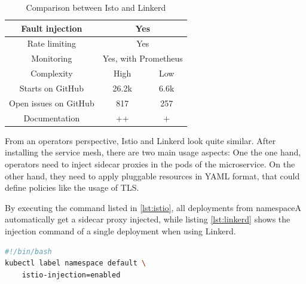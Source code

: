 \begin{table}
\begin{tabular*}{\columnwidth}{c|c|c}
Fault injection                  & \multicolumn{2}{c}{Yes}                                                                                                          \\\hline
Rate limiting                    & \multicolumn{2}{c}{Yes}                                                                                                          \\\hline
Monitoring                       & \multicolumn{2}{c}{Yes, with Prometheus}                                                                                         \\\hline
Complexity                       & High                                                                                                               & Low         \\\hline
Starts on GitHub \cite{linkerd-github} \cite{istio-github}              & 26.2k & 6.6k        \\\hline
Open issues on GitHub \cite{linkerd-github} \cite{istio-github}                 & 817                                                                                                                & 257         \\\hline
Documentation                    & ++                                                                                                                 & +          
\end{tabular*}
\vspace{0.25mm}
\caption{Comparison between Isto and Linkerd}
\label{tab:istio-linkerd}
\end{table}


%
%
%
%

From an operators perspective, Istio and Linkerd look quite similar. After installing the service mesh, there are two main usage aspects: One the one hand, operators need to inject sidecar proxies in the pods of the microservice. On the other hand, they need to apply pluggable resources in YAML format, that could define policies like the usage of TLS.

By executing the command listed in \ref{lst:istio}, all deployments from namespaceA automatically get a sidecar proxy injected, while listing \ref{lst:linkerd} shows the injection command of a single deployment when using Linkerd.

\begin{lstlisting}[language=bash,caption={Injection of sidecards into deployments of a namespace in Istio},label={lst:istio}]
#!/bin/bash
kubectl label namespace default \
	istio-injection=enabled
\end{lstlisting}


